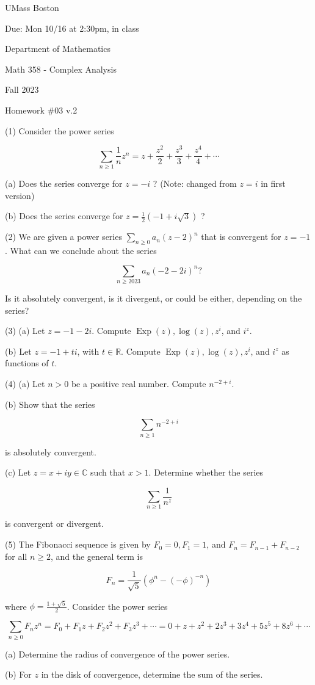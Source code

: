 \documentclass[10pt]{article}
\begin{document}
UMass Boston

Due: Mon 10/16 at 2:30pm, in class

Department of Mathematics

Math 358 - Complex Analysis

Fall 2023

Homework \#03 v.2

(1) Consider the power series

$$
\sum_{n \geqslant 1} \frac{1}{n} z^{n}=z+\frac{z^{2}}{2}+\frac{z^{3}}{3}+\frac{z^{4}}{4}+\cdots
$$

(a) Does the series converge for $z=-i$ ? (Note: changed from $z=i$ in first version)

(b) Does the series converge for $z=\frac{1}{2}(-1+i \sqrt{3})$ ?

(2) We are given a power series $\sum_{n \geqslant 0} a_{n}(z-2)^{n}$ that is convergent for $z=-1$. What can we conclude about the series

$$
\sum_{n \geqslant 2023} a_{n}(-2-2 i)^{n} ?
$$

Is it absolutely convergent, is it divergent, or could be either, depending on the series?

(3) (a) Let $z=-1-2 i$. Compute $\operatorname{Exp}(z), \log (z), z^{i}$, and $i^{z}$.

(b) Let $z=-1+t i$, with $t \in \mathbb{R}$. Compute $\operatorname{Exp}(z), \log (z), z^{i}$, and $i^{z}$ as functions of $t$.

(4) (a) Let $n>0$ be a positive real number. Compute $n^{-2+i}$.

(b) Show that the series

$$
\sum_{n \geqslant 1} n^{-2+i}
$$

is absolutely convergent.

(c) Let $z=x+i y \in \mathbb{C}$ such that $x>1$. Determine whether the series

$$
\sum_{n \geqslant 1} \frac{1}{n^{z}}
$$

is convergent or divergent.

(5) The Fibonacci sequence is given by $F_{0}=0, F_{1}=1$, and $F_{n}=F_{n-1}+F_{n-2}$ for all $n \geqslant 2$, and the general term is

$$
F_{n}=\frac{1}{\sqrt{5}}\left(\phi^{n}-(-\phi)^{-n}\right)
$$

where $\phi=\frac{1+\sqrt{5}}{2}$. Consider the power series

$$
\sum_{n \geqslant 0} F_{n} z^{n}=F_{0}+F_{1} z+F_{2} z^{2}+F_{3} z^{3}+\cdots=0+z+z^{2}+2 z^{3}+3 z^{4}+5 z^{5}+8 z^{6}+\cdots
$$

(a) Determine the radius of convergence of the power series.

(b) For $z$ in the disk of convergence, determine the sum of the series.
\end{document}

